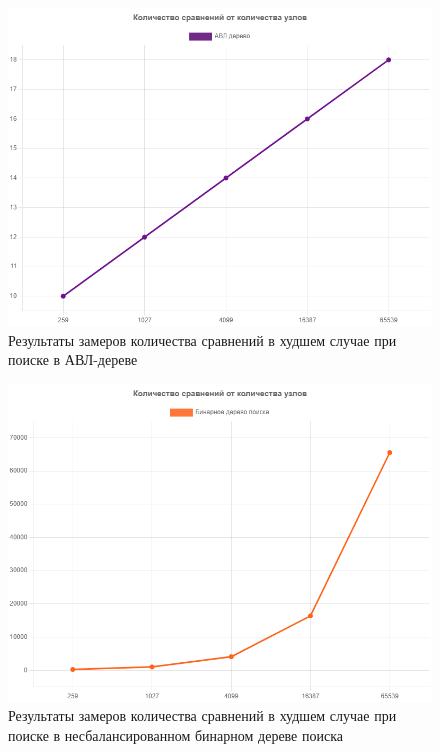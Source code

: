 \begin{figure}[h]
	\centering
	\includegraphics[height=0.4\textheight]{img/avl-graph.png}
	\caption{Результаты замеров количества сравнений в худшем случае при поиске в АВЛ-дереве}
	\label{fig:avl-res}
\end{figure}

\begin{figure}[h]
	\centering
	\includegraphics[height=0.4\textheight]{img/bst-graph.png}
	\caption{Результаты замеров количества сравнений в худшем случае при поиске в несбалансированном бинарном дереве поиска}
	\label{fig:bst-res}
\end{figure}

\newpage


